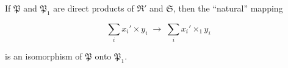 If $\mathfrak{P}$ and $\mathfrak{P}_1$ are direct products of $\mathfrak{R}'$ and $\mathfrak{S}$, then the ``natural'' mapping

$$\sum_i x_i' \times y_i \;\longrightarrow\; \sum_i x_i' \times_1 y_i$$

is an isomorphism of $\mathfrak{P}$ onto $\mathfrak{P}_1$.
